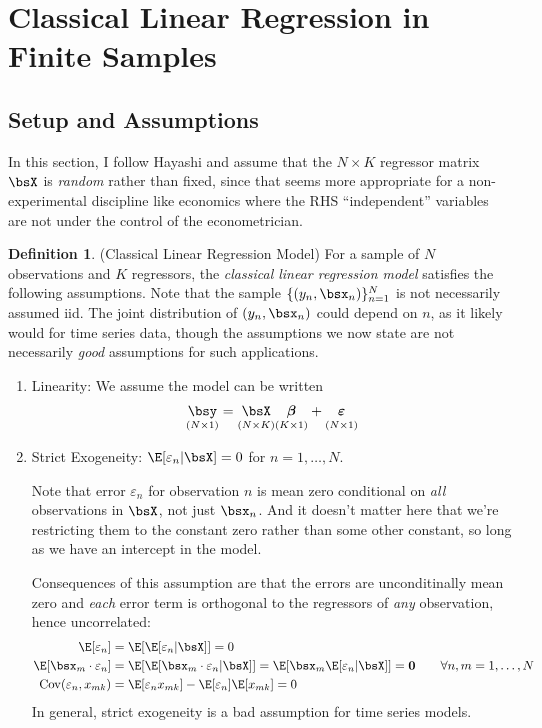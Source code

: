 \documentclass[12pt]{article}
\theoremstyle{plain}
\theoremstyle{definition}
\newtheorem{defn}[thm]{Definition}
\theoremstyle{remark}
\newcommand{\bsvarepsilon}{\boldsymbol{\varepsilon}}
\newcommand{\bsbeta}{\boldsymbol{\beta}}
\renewcommand{\bso}{\boldsymbol{0}}
\newcommand{\Cov}{\operatorname{Cov}}
\newcommand{\nN}{_{n=1}^N}
\begin{document}
\clearpage
\section{Classical Linear Regression in Finite Samples}

\subsection{Setup and Assumptions}

In this section, I follow Hayashi and assume that the $N\times K$
regressor matrix $\bsX$ is \emph{random} rather than fixed, since that
seems more appropriate for a non-experimental discipline like economics
where the RHS ``independent'' variables are not under the control of the
econometrician.


\begin{defn}(Classical Linear Regression Model)
For a sample of $N$ observations and $K$ regressors, the
\emph{classical linear regression model} satisfies the following
assumptions. Note that the sample $\{(y_n,\bsx_n)\}\nN$ is not
necessarily assumed iid. The joint distribution of $(y_n,\bsx_n)$ could
depend on $n$, as it likely would for time series data, though the
assumptions we now state are not necessarily \emph{good} assumptions for
such applications.
\begin{enumerate}
  \item Linearity: We assume the model can be written
    \begin{align}
      \underset{(N\times 1)}{\bsy}
      =
      \underset{(N\times K)}{\vphantom{\bsy} \bsX}
      \underset{(K\times 1)}{\vphantom{\bsy} \bsbeta}
      + \underset{(N\times 1)}{\vphantom{\bsy} \bsvarepsilon}
      \label{regyx}
    \end{align}
  \item Strict Exogeneity: $\E[\varepsilon_n |\bsX]=0$ for
    $n=1,\ldots,N$.

    Note that error $\varepsilon_n$ for observation $n$ is
    mean zero conditional on \emph{all} observations in $\bsX$, not just
    $\bsx_n$.
    And it doesn't matter here that we're restricting them to the
    constant zero rather than some other constant, so long as we have an
    intercept in the model.

    Consequences of this assumption are that the errors are
    unconditinally mean zero and \emph{each} error term is orthogonal to
    the regressors of \emph{any} observation, hence uncorrelated:
    \begin{align*}
      \E[\varepsilon_n] &= \E[\E[\varepsilon_n|\bsX]] = 0 \\
      \E[\bsx_m \cdot \varepsilon_n] &=
      \E[\E[\bsx_m \cdot \varepsilon_n|\bsX]] =
      \E[\bsx_m\E[ \varepsilon_n|\bsX]] = \bso
      \qquad \forall n,m = 1,\ldots,N \\
      \Cov(\varepsilon_n, x_{mk})
      &=
      \E[\varepsilon_n x_{mk}] - \E[\varepsilon_n]\E[x_{mk}] = 0
    \end{align*}
    In general, strict exogeneity is a bad assumption for time series
    models.


\end{enumerate}
\end{defn}
\end{document}
